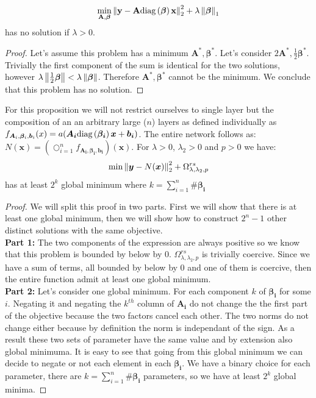\begin{proposition}
\label{unconstrained_shrinknet_no_min}
\begin{equation*}
     \min_{\bf{A}, \bm{\beta}} \left\lVert\bf{y} - \bf{A}\text{diag}\left(\bm{\beta}\right)\bf{x}\right\rVert_2^2 + \lambda \left\lVert\bm{\beta}\right\rVert_1
\end{equation*}
has no solution if $\lambda > 0$.
\end{proposition}
\begin{proof}
  Let's assume this problem has a minimum $\bm{A}^*, \bm{\beta}^*$. Let's consider $2\bm{A}^*, \frac{1}{2}\bm{\beta}^*$. Trivially the first component of the sum is identical for the two solutions, however $\lambda\left\lVert\frac{1}{2}\bm{\beta}\right\rVert < \lambda\left\lVert\bm{\beta}\right\rVert$. Therefore $\bm{A}^*, \bm{\beta}^*$ cannot be the minimum. We conclude that this problem has no solution.
\end{proof}
\begin{proposition}
  \label{shrinknet_regularized_minimum}
For this proposition we will not restrict ourselves to single layer but the composition of an an arbitrary large ($n$) layers as defined individually as $f_{\bm{A}_i, \bm{\beta}_i, \bm{b}_i}(x) = a(\bm{A_i}\text{diag}\left(\bm{\beta_i}\right)\bm{x} + \bm{b_i})$. The entire network follows as: $N(\bm{x}) = \left(\bigcirc_{i=1}^n f_{\bm{A_i}, \bm{\beta_i}, \bm{b_i}}\right)(\bm{x})$. For $\lambda > 0$, $\lambda_2 > 0$ and $p > 0$ we have:
  \begin{equation*}
    \min \left\lVert\bm{y} - N(\bm{x})\right\rVert_2^2 + \Omega_{\lambda, \lambda_2, p}^{rs}
  \end{equation*}
  has at least $2^k$ global minimum where $k = \sum_{i=1}^n \#\bm{\beta_i}$
\end{proposition}

\begin{proof}
  We will split this proof in two parts. First we will show that there is at least
  one global minimum, then we will show how to construct $2^n - 1$ other distinct
  solutions with the same objective.
\\ \textbf{Part 1:}
The two components of the expression are always positive so we know that this problem is bounded by below by $0$. $\Omega_{\lambda, \lambda_2, p}^{rs}$ is trivially coercive. Since we have a sum of terms, all bounded by below by $0$ and one of them is coercive, then the entire function admit at least one global minimum.
\\ \textbf{Part 2:} Let's consider one global minimum. For each component $k$ of $\bm{\beta_i}$ for some $i$. Negating it and negating the $k^{th}$ column of $\bm{A_i}$ do not change the the first part of the objective because the two factors cancel each other. The two norms do not change either because by definition the norm is independant of the sign. As a result these two sets of parameter have the same value and by extension also global minimuma. It is easy to see that going from this global minimum we can decide to negate or not each element in each $\bm{\beta_i}$. We have a binary choice for each parameter, there are $k = \sum_{i=1}^n \#\bm{\beta_i}$ parameters, so we have at least $2^k$ global minima.

\end{proof}
